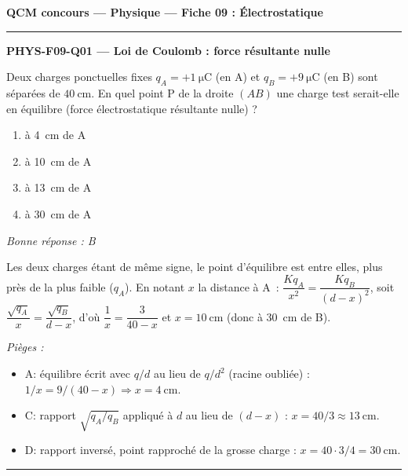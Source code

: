 \documentclass[11pt,a4paper]{article}
\begin{document}
\begin{center}\Large\bfseries QCM concours --- Physique --- Fiche 09 : Électrostatique\end{center}
\vspace{6pt}\hrule\vspace{8pt}

\noindent\textbf{PHYS-F09-Q01 --- Loi de Coulomb : force résultante nulle}\par
Deux charges ponctuelles fixes $q_A=+\qty{1}{\micro\coulomb}$ (en A) et $q_B=+\qty{9}{\micro\coulomb}$ (en B) sont séparées de $\qty{40}{\centi\metre}$. En quel point P de la droite $(AB)$ une charge test serait-elle en équilibre (force électrostatique résultante nulle) ?
\begin{center}
\end{center}
\begin{enumerate}[label=\Alph*)]
\item à \qty{4}{\centi\metre} de A
\item à \qty{10}{\centi\metre} de A
\item à \qty{13}{\centi\metre} de A
\item à \qty{30}{\centi\metre} de A
\end{enumerate}
\textit{Bonne réponse : B}\par
Les deux charges étant de même signe, le point d'équilibre est entre elles, plus près de la plus faible ($q_A$). En notant $x$ la distance à A~: $\dfrac{Kq_A}{x^{2}}=\dfrac{Kq_B}{(d-x)^{2}}$, soit $\dfrac{\sqrt{q_A}}{x}=\dfrac{\sqrt{q_B}}{d-x}$, d'où $\dfrac{1}{x}=\dfrac{3}{40-x}$ et $x=\qty{10}{\centi\metre}$ (donc à \qty{30}{\centi\metre} de B).\par
\textit{Pièges :}
\begin{itemize}
\item A: équilibre écrit avec $q/d$ au lieu de $q/d^{2}$ (racine oubliée) : $1/x=9/(40-x)\Rightarrow x=\qty{4}{\centi\metre}$.
\item C: rapport $\sqrt{q_A/q_B}$ appliqué à $d$ au lieu de $(d-x)$ : $x=40/3\approx\qty{13}{\centi\metre}$.
\item D: rapport inversé, point rapproché de la grosse charge : $x=40\cdot 3/4=\qty{30}{\centi\metre}$.
\end{itemize}
\vspace{8pt}\hrule\vspace{8pt}
\end{document}
